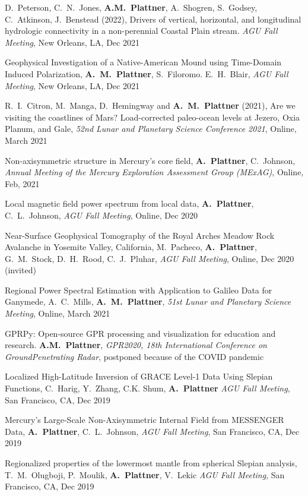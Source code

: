 \documentclass[10pt]{article}
\begin{document}
\spcp D.~Peterson, C.~N.~Jones, \textbf{A.M.~Plattner}, A.~Shogren,
S.~Godsey, C.~Atkinson, J.~Benstead (2022), Drivers of vertical,
horizontal, and longitudinal hydrologic connectivity in a
non-perennial Coastal Plain stream. \emph{AGU Fall Meeting}, New
Orleans, LA, Dec 2021

\spcp Geophysical Investigation of a Native-American Mound using
Time-Domain Induced Polarization, \textbf{A.~M.~Plattner},
S.~Filoromo. E.~H.~Blair, \emph{AGU Fall Meeting}, New Orleans, LA,
Dec 2021

\spcp R.~I.~Citron, M.~Manga, D.~Hemingway and \textbf{A.~M.~Plattner}
(2021), Are we visiting the coastlines of Mars? Load-corrected
paleo-ocean levels at Jezero, Oxia Planum, and Gale, \emph{52nd Lunar
and Planetary Science Conference 2021}, Online, March 2021

\spcp Non-axisymmetric structure in Mercury's core field,
\textbf{A.~Plattner}, C.~Johnson, \emph{Annual Meeting of the Mercury
Exploration Assessment Group (MExAG)}, Online, Feb, 2021

\spcp
Local magnetic field power spectrum from local data,
\textbf{A.~Plattner}, C.~L.~Johnson, 
\emph{AGU Fall Meeting}, Online, Dec 2020 

\spcp
Near-Surface Geophysical Tomography of the Royal Arches Meadow Rock
Avalanche in Yosemite Valley, California, M.~Pacheco,
\textbf{A.~Plattner}, G.~M.~Stock, D.~H.~Rood, C.~J.~Pluhar, \emph{AGU
Fall Meeting}, Online, Dec 2020 (invited)

\spcp Regional Power Spectral Estimation with Application to Galileo
Data for Ganymede, A.~C.~Mills, \textbf{A.~M.~Plattner}, \emph{51st
Lunar and Planetary Science Meeting}, Online, March 2021

\spcp GPRPy: Open-source GPR processing and visualization for
education and research. \textbf{A.M.~Plattner}, \emph{GPR2020, 18th
International Conference on GroundPenetrating Radar}, postponed
because of the COVID pandemic

\spcp
Localized High-Latitude Inversion of GRACE Level-1 Data Using Slepian Functions,
C.~Harig, Y.~Zhang, C.K. Shum, \textbf{A.~Plattner}
\emph{AGU Fall Meeting}, San Francisco, CA, Dec 2019

\spcp Mercury's Large-Scale Non-Axisymmetric Internal Field from
MESSENGER Data, \textbf{A.~Plattner}, C.~L.~Johnson, \emph{AGU Fall
Meeting}, San Francisco, CA, Dec 2019

\spcp
Regionalized properties of the lowermost mantle from spherical Slepian analysis,
T.~M.~Olugboji, P.~Moulik, \textbf{A.~Plattner}, V.~Lekic
\emph{AGU Fall Meeting}, San Francisco, CA, Dec 2019
\end{document}
